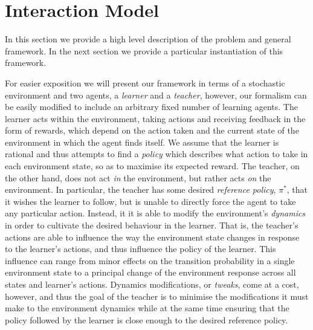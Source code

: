 \section{Interaction Model}\label{sec: GeneralModel}
\noindent 
In this section we provide a high level description of the problem and
general framework.  In the next section we provide a particular
instantiation of this 
framework.

For easier exposition we will present our framework in terms of 
a stochastic environment and two agents, a \emph{learner} and a
\emph{teacher}, however, our formalism can be easily modified to
include an arbitrary fixed number of learning agents. The learner acts
within the environment, taking actions and receiving feedback in the
form of rewards, which depend on the action taken and the current
state of the environment in which the agent finds itself.  We assume
that the learner is rational and thus attempts to find a \emph{policy}
which describes what action to take in each environment state, so as
to maximise its expected reward.  The teacher, on the other hand,
does not act \emph{in} the environment, but rather acts \emph{on} the
environment.  In particular, the teacher has some desired
\emph{reference policy}, $\pi^*$, that it wishes the learner to
follow, but is unable to directly force the agent to take any
particular action.  Instead, it it is able to modify the environment's
\emph{dynamics} in order to cultivate the desired behaviour in the
learner.  That is, the teacher's actions are able to influence the way
the environment state changes in response to the learner's actions,
and thus influence the policy of the learner. This influence can range
from minor effects on the transition probability in a single
environment state to a principal change of the environment response
across all states and learner's actions. Dynamics modifications, or
\emph{tweaks}, come at a cost, however, and thus the goal of the
teacher is to minimise the modifications it must make to the
environment dynamics while at the same time ensuring that the policy
followed by the learner is close enough to the desired reference
policy.

